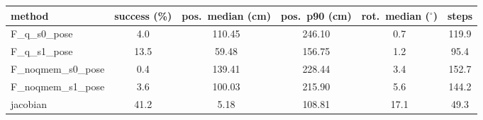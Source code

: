 \begin{tabular}{lccccc}
\hline
method & success (\%) & pos.\ median (cm) & pos.\ p90 (cm) & rot.\ median ($^\circ$) & steps \\
\hline
F\_q\_s0\_pose & 4.0 & 110.45 & 246.10 & 0.7 & 119.9 \\
F\_q\_s1\_pose & 13.5 & 59.48 & 156.75 & 1.2 & 95.4 \\
F\_noqmem\_s0\_pose & 0.4 & 139.41 & 228.44 & 3.4 & 152.7 \\
F\_noqmem\_s1\_pose & 3.6 & 100.03 & 215.90 & 5.6 & 144.2 \\
jacobian & 41.2 & 5.18 & 108.81 & 17.1 & 49.3 \\
\hline
\end{tabular}
